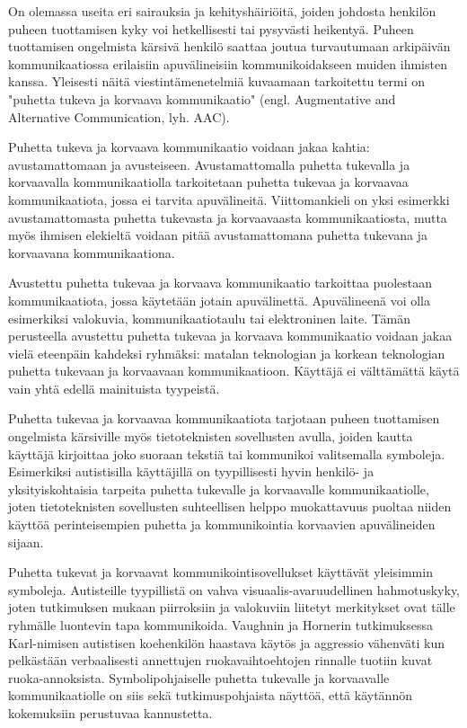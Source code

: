 \documentclass[utf8]{gradu3}
\begin{document}
On olemassa useita eri sairauksia ja kehityshäiriöitä, joiden johdosta henkilön puheen tuottamisen kyky voi hetkellisesti tai pysyvästi heikentyä. Puheen tuottamisen ongelmista kärsivä henkilö saattaa joutua turvautumaan arkipäivän kommunikaatiossa erilaisiin apuvälineisiin kommunikoidakseen muiden ihmisten kanssa. Yleisesti näitä viestintämenetelmiä kuvaamaan tarkoitettu termi on "puhetta tukeva ja korvaava kommunikaatio" (engl. Augmentative and Alternative Communication, lyh. AAC).

Puhetta tukeva ja korvaava kommunikaatio voidaan jakaa kahtia: avustamattomaan ja avusteiseen. Avustamattomalla puhetta tukevalla ja korvaavalla kommunikaatiolla tarkoitetaan puhetta tukevaa ja korvaavaa kommunikaatiota, jossa ei tarvita apuvälineitä. Viittomankieli on yksi esimerkki avustamattomasta puhetta tukevasta ja korvaavaasta kommunikaatiosta, mutta myös ihmisen elekieltä voidaan pitää avustamattomana puhetta tukevana ja korvaavana kommunikaationa. 

Avustettu puhetta tukevaa ja korvaava kommunikaatio tarkoittaa puolestaan kommunikaatiota, jossa käytetään jotain apuvälinettä. Apuvälineenä voi olla esimerkiksi valokuvia, kommunikaatiotaulu tai elektroninen laite. Tämän perusteella avustettu puhetta tukevaa ja korvaava kommunikaatio voidaan jakaa vielä eteenpäin kahdeksi ryhmäksi: matalan teknologian ja korkean teknologian puhetta tukevaan ja korvaavaan kommunikaatioon. Käyttäjä ei välttämättä käytä vain yhtä edellä mainituista tyypeistä. \parencite[]{AAC-conditional-use}

Puhetta tukevaa ja korvaavaa kommunikaatiota tarjotaan puheen tuottamisen ongelmista kärsiville myös tietoteknisten sovellusten avulla, joiden kautta käyttäjä kirjoittaa joko suoraan tekstiä tai kommunikoi valitsemalla symboleja. Esimerkiksi autistisilla käyttäjillä on tyypillisesti hyvin henkilö- ja yksityiskohtaisia tarpeita puhetta tukevalle ja korvaavalle kommunikaatiolle, joten tietoteknisten sovellusten suhteellisen helppo muokattavuus puoltaa niiden käyttöä perinteisempien puhetta ja kommunikointia korvaavien apuvälineiden sijaan.

Puhetta tukevat ja korvaavat kommunikointisovellukset käyttävät yleisimmin symboleja. Autisteille tyypillistä on vahva visuaalis-avaruudellinen hahmotuskyky, joten tutkimuksen mukaan piirroksiin ja valokuviin liitetyt merkitykset ovat tälle ryhmälle luontevin tapa kommunikoida. Vaughnin ja Hornerin tutkimuksessa  \parencite[]{concrete-versus-verbal} Karl-nimisen autistisen koehenkilön haastava käytös ja aggressio vähenväti kun pelkästään verbaalisesti annettujen ruokavaihtoehtojen rinnalle tuotiin kuvat ruoka-annoksista. Symbolipohjaiselle puhetta tukevalle ja korvaavalle kommunikaatiolle on siis sekä tutkimuspohjaista näyttöä, että käytännön kokemuksiin perustuvaa kannustetta.
\end{document}
